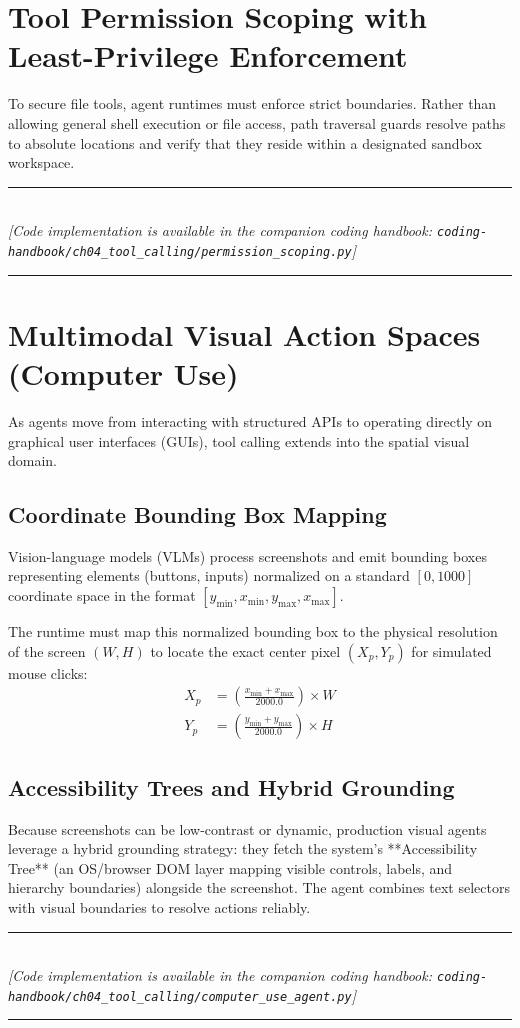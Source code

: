 \section{Tool Permission Scoping with Least-Privilege Enforcement}

To secure file tools, agent runtimes must enforce strict boundaries. Rather than allowing general shell execution or file access, path traversal guards resolve paths to absolute locations and verify that they reside within a designated sandbox workspace.

\begin{center}
\noindent\rule{0.6\textwidth}{0.4pt} \\
\vspace{0.3em}
\textit{[Code implementation is available in the companion coding handbook: \texttt{coding-handbook/ch04\_tool\_calling/permission\_scoping.py}]} \\
\noindent\rule{0.6\textwidth}{0.4pt}
\end{center}

\section{Multimodal Visual Action Spaces (Computer Use)}

As agents move from interacting with structured APIs to operating directly on graphical user interfaces (GUIs), tool calling extends into the spatial visual domain.

\subsection{Coordinate Bounding Box Mapping}
Vision-language models (VLMs) process screenshots and emit bounding boxes representing elements (buttons, inputs) normalized on a standard $[0, 1000]$ coordinate space in the format $[y_{\text{min}}, x_{\text{min}}, y_{\text{max}}, x_{\text{max}}]$. 

The runtime must map this normalized bounding box to the physical resolution of the screen $(W, H)$ to locate the exact center pixel $(X_p, Y_p)$ for simulated mouse clicks:
\begin{align}
X_p &= \left( \frac{x_{\text{min}} + x_{\text{max}}}{2000.0} \right) \times W \\
Y_p &= \left( \frac{y_{\text{min}} + y_{\text{max}}}{2000.0} \right) \times H
\end{align}

\subsection{Accessibility Trees and Hybrid Grounding}
Because screenshots can be low-contrast or dynamic, production visual agents leverage a hybrid grounding strategy: they fetch the system's **Accessibility Tree** (an OS/browser DOM layer mapping visible controls, labels, and hierarchy boundaries) alongside the screenshot. The agent combines text selectors with visual boundaries to resolve actions reliably.

\begin{center}
\noindent\rule{0.6\textwidth}{0.4pt} \\
\vspace{0.3em}
\textit{[Code implementation is available in the companion coding handbook: \texttt{coding-handbook/ch04\_tool\_calling/computer\_use\_agent.py}]} \\
\noindent\rule{0.6\textwidth}{0.4pt}
\end{center}


